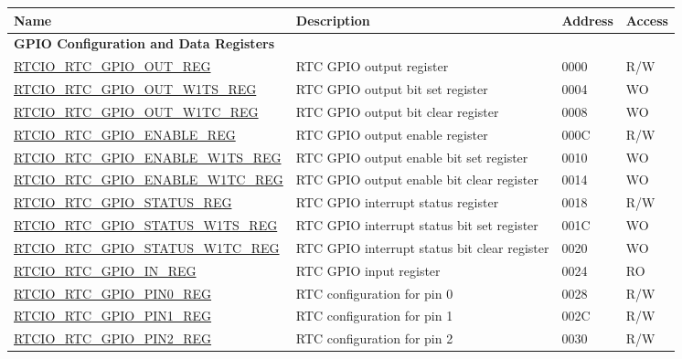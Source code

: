 \begin{longtable}{ | p{6.2cm} | p{7cm} | p{1.3cm} | p{1cm} | }
\hline\rowcolor{lightgray}
Name & Description &  Address & Access \\ \hline
\endhead
\multicolumn{4}{|l|}{\textbf{GPIO Configuration and Data Registers}} \\ \hline
\hyperref[regdesc:RTCIORTCGPIOOUTREG]{RTCIO\_RTC\_GPIO\_OUT\_REG} & RTC GPIO output register & \hexprefix{}0000 & R/W \\ \hline
\hyperref[regdesc:RTCIORTCGPIOOUTW1TSREG]{RTCIO\_RTC\_GPIO\_OUT\_W1TS\_REG} & RTC GPIO output bit set register & \hexprefix{}0004 & WO \\ \hline
\hyperref[regdesc:RTCIORTCGPIOOUTW1TCREG]{RTCIO\_RTC\_GPIO\_OUT\_W1TC\_REG} & RTC GPIO output bit clear register & \hexprefix{}0008 & WO \\ \hline
\hyperref[regdesc:RTCIORTCGPIOENABLEREG]{RTCIO\_RTC\_GPIO\_ENABLE\_REG} & RTC GPIO output enable register & \hexprefix{}000C & R/W \\ \hline
\hyperref[regdesc:RTCIORTCGPIOENABLEW1TSREG]{RTCIO\_RTC\_GPIO\_ENABLE\_W1TS\_REG} & RTC GPIO output enable bit set register & \hexprefix{}0010 & WO \\ \hline
\hyperref[regdesc:RTCIORTCGPIOENABLEW1TCREG]{RTCIO\_RTC\_GPIO\_ENABLE\_W1TC\_REG} & RTC GPIO output enable bit clear register & \hexprefix{}0014 & WO \\ \hline
\hyperref[regdesc:RTCIORTCGPIOSTATUSREG]{RTCIO\_RTC\_GPIO\_STATUS\_REG} & RTC GPIO interrupt status register & \hexprefix{}0018 & R/W \\ \hline
\hyperref[regdesc:RTCIORTCGPIOSTATUSW1TSREG]{RTCIO\_RTC\_GPIO\_STATUS\_W1TS\_REG} & RTC GPIO interrupt status bit set register & \hexprefix{}001C & WO \\ \hline
\hyperref[regdesc:RTCIORTCGPIOSTATUSW1TCREG]{RTCIO\_RTC\_GPIO\_STATUS\_W1TC\_REG} & RTC GPIO interrupt status bit clear register & \hexprefix{}0020 & WO \\ \hline
\hyperref[regdesc:RTCIORTCGPIOINREG]{RTCIO\_RTC\_GPIO\_IN\_REG} & RTC GPIO input register & \hexprefix{}0024 & RO \\ \hline
\hyperref[regdesc:RTCIORTCGPIOPINNREG]{RTCIO\_RTC\_GPIO\_PIN0\_REG} & RTC configuration for pin 0 & \hexprefix{}0028 & R/W \\ \hline
\hyperref[regdesc:RTCIORTCGPIOPINNREG]{RTCIO\_RTC\_GPIO\_PIN1\_REG} & RTC configuration for pin 1 & \hexprefix{}002C & R/W \\ \hline
\hyperref[regdesc:RTCIORTCGPIOPINNREG]{RTCIO\_RTC\_GPIO\_PIN2\_REG} & RTC configuration for pin 2 & \hexprefix{}0030 & R/W \\ \hline

\end{longtable}
